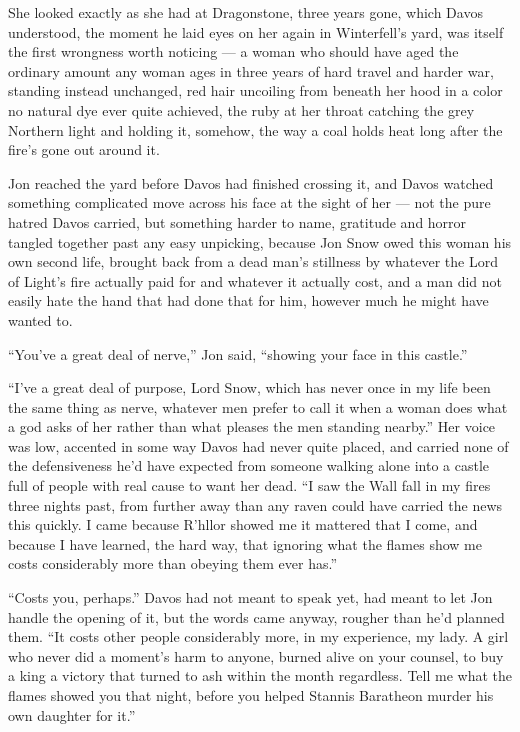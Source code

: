 \sceneBreak

She looked exactly as she had at Dragonstone, three years gone, which Davos understood, the moment he laid eyes on her again in Winterfell’s yard, was itself the first wrongness worth noticing — a woman who should have aged the ordinary amount any woman ages in three years of hard travel and harder war, standing instead unchanged, red hair uncoiling from beneath her hood in a color no natural dye ever quite achieved, the ruby at her throat catching the grey Northern light and holding it, somehow, the way a coal holds heat long after the fire’s gone out around it.

Jon reached the yard before Davos had finished crossing it, and Davos watched something complicated move across his face at the sight of her — not the pure hatred Davos carried, but something harder to name, gratitude and horror tangled together past any easy unpicking, because Jon Snow owed this woman his own second life, brought back from a dead man’s stillness by whatever the Lord of Light’s fire actually paid for and whatever it actually cost, and a man did not easily hate the hand that had done that for him, however much he might have wanted to.

“You’ve a great deal of nerve,” Jon said, “showing your face in this castle.”

“I’ve a great deal of purpose, Lord Snow, which has never once in my life been the same thing as nerve, whatever men prefer to call it when a woman does what a god asks of her rather than what pleases the men standing nearby.” Her voice was low, accented in some way Davos had never quite placed, and carried none of the defensiveness he’d have expected from someone walking alone into a castle full of people with real cause to want her dead. “I saw the Wall fall in my fires three nights past, from further away than any raven could have carried the news this quickly. I came because R’hllor showed me it mattered that I come, and because I have learned, the hard way, that ignoring what the flames show me costs considerably more than obeying them ever has.”

“Costs you, perhaps.” Davos had not meant to speak yet, had meant to let Jon handle the opening of it, but the words came anyway, rougher than he’d planned them. “It costs other people considerably more, in my experience, my lady. A girl who never did a moment’s harm to anyone, burned alive on your counsel, to buy a king a victory that turned to ash within the month regardless. Tell me what the flames showed you that night, before you helped Stannis Baratheon murder his own daughter for it.”


